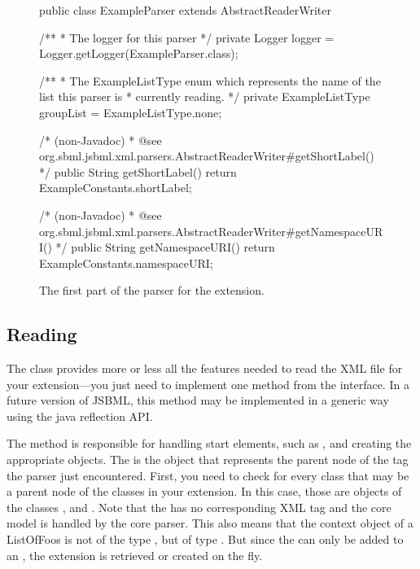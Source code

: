 \begin{figure}[htb]
  \begin{example}[numbers=left]
public class ExampleParser extends AbstractReaderWriter {
  /**
   * The logger for this parser
   */
  private Logger logger = Logger.getLogger(ExampleParser.class);

  /**
   * The ExampleListType enum which represents the name of the list this parser is
   * currently reading.
   */
  private ExampleListType groupList = ExampleListType.none;

  /* (non-Javadoc)
   * @see org.sbml.jsbml.xml.parsers.AbstractReaderWriter#getShortLabel()
   */
  public String getShortLabel() {
    return ExampleConstants.shortLabel;
  }

  /* (non-Javadoc)
   * @see org.sbml.jsbml.xml.parsers.AbstractReaderWriter#getNamespaceURI()
   */
  public String getNamespaceURI() {
    return ExampleConstants.namespaceURI;
  }
}\end{example}
 \caption{The first part of the parser for the extension.}
 \label{lst:ModelExtParserClass}
\end{figure}


\subsection{Reading}

The class  provides more or less all the 
features needed to read the XML file for your extension---you just need to implement one
method from the  interface. In a future version of JSBML, this method
may be implemented in a generic way using the java reflection API.

The  method is responsible for handling start
elements, such as , and creating the appropriate
objects.  The  is the object that represents the parent
node of the tag the parser just encountered.  First, you need to check for
every class that may be a parent node of the classes in your extension.  In
this case, those are objects of the classes \Model,  and
.  Note that the  has no corresponding XML
tag and the core model is handled by the core parser.  This also
means that the context object of a ListOfFoos is not of the type
, but of type \Model.  But since the 
can only be added to an , the extension is retrieved or
created on the fly.

